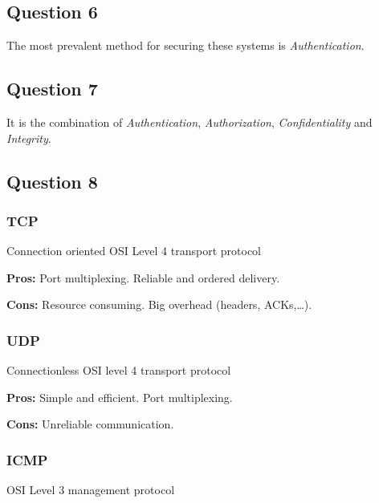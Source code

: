\documentclass[10pt,a4paper,twoside,onecolumn]{article}
\begin{document}
\subsection{Question 6}

The most prevalent method for securing these systems is \textit{Authentication}.

\subsection{Question 7}

It is the combination of \textit{Authentication}, \textit{Authorization}, \textit{Confidentiality} and \textit{Integrity}.

\subsection{Question 8}

\subsubsection{TCP}

Connection oriented OSI Level 4 transport protocol

\begin{description}[noitemsep]
	\item{\textbf{Pros:}} Port multiplexing. Reliable and ordered delivery.
	\item{\textbf{Cons:}} Resource consuming. Big overhead (headers, ACKs,…).
\end{description}

\subsubsection{UDP}

Connectionless OSI level 4 transport protocol

\begin{description}[noitemsep]
	\item{\textbf{Pros:}} Simple and efficient. Port multiplexing.
	\item{\textbf{Cons:}} Unreliable communication.
\end{description}

\subsubsection{ICMP}

OSI Level 3 management protocol
\end{document}
